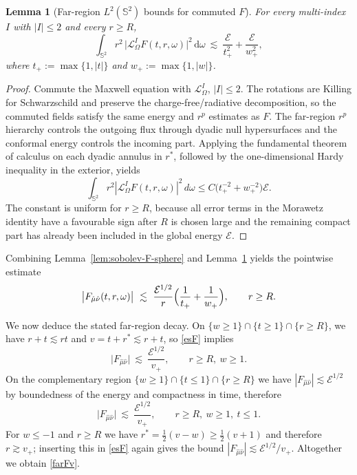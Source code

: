 \documentclass[11pt]{article}
\numberwithin{equation}{section}
\theoremstyle{plain}
\newtheorem{lemma}[theorem]{Lemma}
\theoremstyle{definition}
\theoremstyle{remark}
\newcommand{\dd}{\mathrm{d}}
\begin{document}
\begin{lemma}[Far-region $L^{2}(\mathbb S^{2})$ bounds for commuted $F$]\label{lem:far-sphere-L2-F}
For every multi-index $I$ with $|I|\le 2$ and every $r\ge R$,
\begin{equation}\label{eq:far-sphere-L2-F}
\int_{\mathbb S^{2}} r^{2}\,\bigl|\mathcal L_{\Omega}^{I}F(t,r,\omega)\bigr|^{2}\,\dd\omega
\ \lesssim\ \frac{\mathcal E}{t_{+}^{2}}+\frac{\mathcal E}{w_{+}^{2}},
\end{equation}
where $t_{+}:=\max\{1,|t|\}$ and $w_{+}:=\max\{1,|w|\}$.
\end{lemma}


\begin{proof}
Commute the Maxwell equation with \(\mathcal L_\Omega^I\), \(|I|\le2\).  The rotations are Killing for Schwarzschild and preserve the charge-free/radiative decomposition, so the commuted fields satisfy the same energy and \(r^p\) estimates as \(F\).  The far-region \(r^p\) hierarchy controls the outgoing flux through dyadic null hypersurfaces and the conformal energy controls the incoming part.  Applying the fundamental theorem of calculus on each dyadic annulus in \(r^*\), followed by the one-dimensional Hardy inequality in the exterior, yields
\[
 \int_{\mathbb S^2}r^2|\mathcal L_\Omega^IF(t,r,\omega)|^2\,d\omega
 \le C\bigl(t_+^{-2}+w_+^{-2}\bigr)\mathcal E.
\]
The constant is uniform for \(r\ge R\), because all error terms in the Morawetz identity have a favourable sign after \(R\) is chosen large and the remaining compact part has already been included in the global energy \(\mathcal E\).
\end{proof}

Combining Lemma~\ref{lem:sobolev-F-sphere} and Lemma~\ref{lem:far-sphere-L2-F} yields the pointwise estimate
\begin{equation}\label{esF}
\bigl|F_{\hat\mu\hat\nu}(t,r,\omega)\bigr|
\ \lesssim\ \frac{\mathcal E^{1/2}}{r}\Bigl(\frac{1}{t_{+}}+\frac{1}{w_{+}}\Bigr),
\qquad r\ge R.
\end{equation}

We now deduce the stated far-region decay. On $\{w\ge 1\}\cap\{t\ge 1\}\cap\{r\ge R\}$, we have $r+t\lesssim rt$ and $v=t+r^{\ast}\lesssim r+t$, so \eqref{esF} implies
\begin{equation}\label{region1}
\bigl|F_{\hat\mu\hat\nu}\bigr|\ \lesssim\ \frac{\mathcal E^{1/2}}{v_{+}},
\qquad r\ge R,\ w\ge 1.
\end{equation}
On the complementary region $\{w\ge 1\}\cap\{t\le 1\}\cap\{r\ge R\}$ we have $|F_{\hat\mu\hat\nu}|\lesssim \mathcal E^{1/2}$ by boundedness of the energy and compactness in time, therefore
\begin{equation}\label{comregion}
\bigl|F_{\hat\mu\hat\nu}\bigr|\ \lesssim\ \frac{\mathcal E^{1/2}}{v_{+}},
\qquad r\ge R,\ w\ge 1,\ t\le 1.
\end{equation}
For $w\le -1$ and $r\ge R$ we have $r^{\ast}=\tfrac12(v-w)\ge \tfrac12(v+1)$ and therefore $r\gtrsim v_{+}$; inserting this in \eqref{esF} again gives the bound $|F_{\hat\mu\hat\nu}|\lesssim \mathcal E^{1/2}/v_{+}$.
Altogether we obtain \eqref{farFv}.
\end{document}
